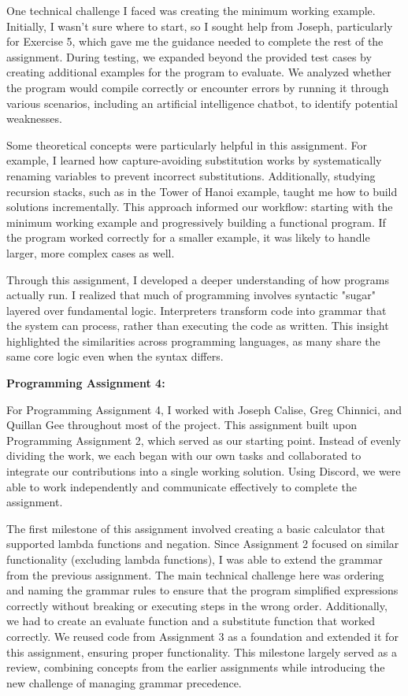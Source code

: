\documentclass{article}
\theoremstyle{theorem}
\theoremstyle{definition}
\theoremstyle{remark}
\begin{document}
One technical challenge I faced was creating the minimum working example. Initially, I wasn’t sure 
where to start, so I sought help from Joseph, particularly for Exercise 5, which gave me the 
guidance needed to complete the rest of the assignment. During testing, we expanded beyond the 
provided test cases by creating additional examples for the program to evaluate. We analyzed whether 
the program would compile correctly or encounter errors by running it through various scenarios, 
including an artificial intelligence chatbot, to identify potential weaknesses.

Some theoretical concepts were particularly helpful in this assignment. For example, I learned 
how capture-avoiding substitution works by systematically renaming variables to prevent 
incorrect substitutions. Additionally, studying recursion stacks, such as in the Tower of Hanoi 
example, taught me how to build solutions incrementally. This approach informed our workflow: 
starting with the minimum working example and progressively building a functional program. 
If the program worked correctly for a smaller example, it was likely to handle larger, more 
complex cases as well.

Through this assignment, I developed a deeper understanding of how programs actually run. I 
realized that much of programming involves syntactic "sugar" layered over fundamental logic. 
Interpreters transform code into grammar that the system can process, rather than executing the 
code as written. This insight highlighted the similarities across programming languages, as many 
share the same core logic even when the syntax differs.

\textbf{Programming Assignment 4:}

For Programming Assignment 4, I worked with Joseph Calise, Greg Chinnici, and Quillan Gee throughout 
most of the project. This assignment built upon Programming Assignment 2, which served as our starting 
point. Instead of evenly dividing the work, we each began with our own tasks and collaborated to 
integrate our contributions into a single working solution. Using Discord, we were able to work 
independently and communicate effectively to complete the assignment.

The first milestone of this assignment involved creating a basic calculator that supported lambda 
functions and negation. Since Assignment 2 focused on similar functionality (excluding lambda functions), 
I was able to extend the grammar from the previous assignment. The main technical challenge here was 
ordering and naming the grammar rules to ensure that the program simplified expressions correctly 
without breaking or executing steps in the wrong order. Additionally, we had to create an evaluate 
function and a substitute function that worked correctly. We reused code from Assignment 3 as a 
foundation and extended it for this assignment, ensuring proper functionality. This milestone 
largely served as a review, combining concepts from the earlier assignments while introducing the 
new challenge of managing grammar precedence.
\end{document}
